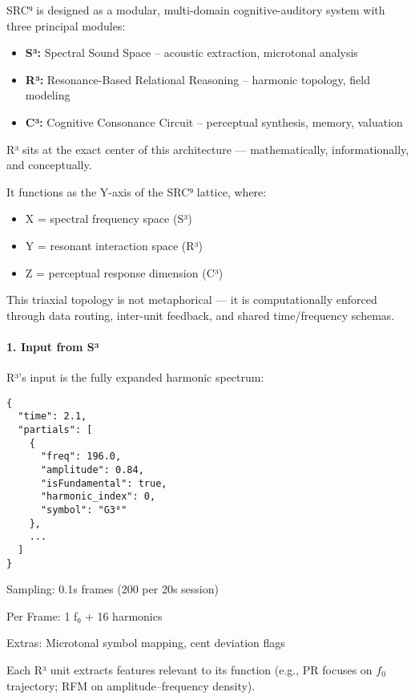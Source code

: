 \documentclass{article}
\begin{document}
SRC⁹ is designed as a modular, multi-domain cognitive-auditory system with three principal modules:

\begin{itemize}
    \item \textbf{S³:} Spectral Sound Space – acoustic extraction, microtonal analysis
    \item \textbf{R³:} Resonance-Based Relational Reasoning – harmonic topology, field modeling
    \item \textbf{C³:} Cognitive Consonance Circuit – perceptual synthesis, memory, valuation
\end{itemize}

R³ sits at the exact center of this architecture — mathematically, informationally, and conceptually.

It functions as the Y-axis of the SRC⁹ lattice, where:

\begin{itemize}
    \item X = spectral frequency space (S³)
    \item Y = resonant interaction space (R³)
    \item Z = perceptual response dimension (C³)
\end{itemize}

This triaxial topology is not metaphorical — it is computationally enforced through data routing, inter-unit feedback, and shared time/frequency schemas.

\paragraph{1. Input from S³}

R³’s input is the fully expanded harmonic spectrum:

\begin{verbatim}
{
  "time": 2.1,
  "partials": [
    {
      "freq": 196.0,
      "amplitude": 0.84,
      "isFundamental": true,
      "harmonic_index": 0,
      "symbol": "G3⁰"
    },
    ...
  ]
}
\end{verbatim}

Sampling: 0.1s frames (200 per 20s session)

Per Frame: 1 f₀ + 16 harmonics

Extras: Microtonal symbol mapping, cent deviation flags

Each R³ unit extracts features relevant to its function (e.g., PR focuses on $f_0$ trajectory; RFM on amplitude–frequency density).
\end{document}
